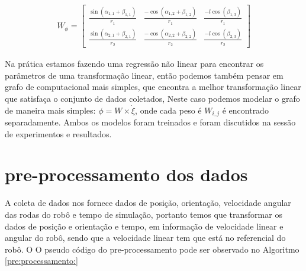 \begin{align}
    W_{\phi} = 
    \begin{bmatrix}
        \frac{\sin(\alpha_{1,1} + \beta_{1,1})}{r_1} &  \frac{-\cos(\alpha_{1,2} + \beta_{1,2})}{r_1} & \frac{-l\cos(\beta_{1,3})}{r_1} \\
        \frac{\sin(\alpha_{2,1} + \beta_{2,1})}{r_2} &  \frac{-\cos(\alpha_{2,2} + \beta_{2,2})}{r_2} & \frac{-l\cos(\beta_{2,3})}{r_2}
    \end{bmatrix}
\end{align}

Na prática estamos fazendo uma regressão não linear para encontrar
os parâmetros de uma transformação linear, então podemos também pensar em
grafo de computacional mais simples, que encontra  a melhor transformação
linear que satisfaça o conjunto de dados coletados,
Neste caso podemos modelar o grafo de maneira mais simples: $\phi=W \times \dot{\xi}$,
onde cada peso é $W_{i,j}$ é encontrado separadamente. Ambos os modelos foram
treinados e foram discutidos na sessão de experimentos e resultados.


\section{pre-processamento dos dados}
A coleta de dados nos fornece dados de posição, orientação, velocidade angular
das rodas do robô e tempo de simulação, portanto temos que transformar os dados
de posição e orientação e tempo, em informação de velocidade linear e angular
do robô, sendo que a velocidade linear tem que está no referencial do robô. O
O pseudo código do pre-processamento pode ser observado no Algoritmo \ref{pre:processamento:}

